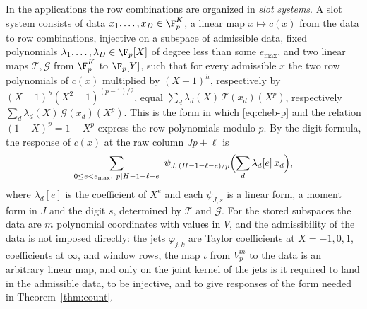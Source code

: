 In the applications the row combinations are organized in \emph{slot systems}. A slot system consists of data
$x_1,\dots,x_D\in\F_p^K$, a linear map $x\mapsto c(x)$ from the data to row combinations, injective on a
subspace of admissible data, fixed polynomials $\lambda_1,\dots,\lambda_D\in\F_p[X]$ of degree less than some
$e_{\max}$, and two linear maps $\mathcal T,\mathcal G$ from $\F_p^K$ to $\F_p[Y]$, such that for every
admissible $x$ the two row polynomials of $c(x)$ multiplied by $(X-1)^h$, respectively by
$(X-1)^h(X^2-1)^{(p-1)/2}$, equal $\sum_d\lambda_d(X)\,\mathcal T(x_d)(X^p)$, respectively
$\sum_d\lambda_d(X)\,\mathcal G(x_d)(X^p)$. This is the form in which \eqref{eq:cheb-p} and the relation
$(1-X)^p=1-X^p$ express the row polynomials modulo $p$. By the digit formula, the response of $c(x)$ at the
raw column $Jp+\ell$ is
\[
 \sum_{0\le e<e_{\max},\ p\mid H-1-\ell-e}\ \psi_{J,\,(H-1-\ell-e)/p}\Bigl(\sum_d\lambda_d[e]\,x_d\Bigr),
\]
where $\lambda_d[e]$ is the coefficient of $X^e$ and each $\psi_{J,s}$ is a linear form, a moment form in $J$
and the digit $s$, determined by $\mathcal T$ and $\mathcal G$. For the stored subspaces the data are $m$
polynomial coordinates with values in $V$, and the admissibility of the data is not imposed directly: the
jets $\varphi_{j,k}$ are Taylor coefficients at $X=-1,0,1$, coefficients at $\infty$, and window rows, the map
$\iota$ from $V_p^m$ to the data is an arbitrary linear map, and only on the joint kernel of the jets is it
required to land in the admissible data, to be injective, and to give responses of the form needed in
Theorem~\ref{thm:count}.

